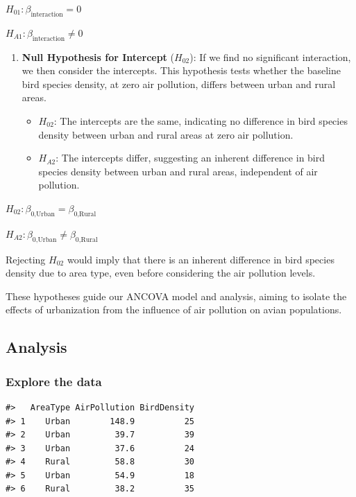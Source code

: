 \documentclass[
  letterpaper,
  DIV=11,
  numbers=noendperiod]{scrreprt}
\begin{document}
\(H_{01}: \beta_{\text{interaction}} = 0\)

\(H_{A1}: \beta_{\text{interaction}} \neq 0\)

\begin{enumerate}
\def\labelenumi{\arabic{enumi}.}
\setcounter{enumi}{2}
\item
  \textbf{Null Hypothesis for Intercept} (\(H_{02}\)): If we find no
  significant interaction, we then consider the intercepts. This
  hypothesis tests whether the baseline bird species density, at zero
  air pollution, differs between urban and rural areas.

  \begin{itemize}
  \item
    \(H_{02}\): The intercepts are the same, indicating no difference in
    bird species density between urban and rural areas at zero air
    pollution.
  \item
    \(H_{A2}\): The intercepts differ, suggesting an inherent difference
    in bird species density between urban and rural areas, independent
    of air pollution.
  \end{itemize}
\end{enumerate}

\(H_{02}: \beta_{0\text{,Urban}} = \beta_{0\text{,Rural}}\)

\(H_{A2}: \beta_{0\text{,Urban}} \neq \beta_{0\text{,Rural}}\)

Rejecting \(H_{02}\) would imply that there is an inherent difference in
bird species density due to area type, even before considering the air
pollution levels.

These hypotheses guide our ANCOVA model and analysis, aiming to isolate
the effects of urbanization from the influence of air pollution on avian
populations.

\subsection{Analysis}\label{analysis}

\subsubsection{Explore the data}\label{explore-the-data}

\begin{verbatim}
#>   AreaType AirPollution BirdDensity
#> 1    Urban        148.9          25
#> 2    Urban         39.7          39
#> 3    Urban         37.6          24
#> 4    Rural         58.8          30
#> 5    Urban         54.9          18
#> 6    Rural         38.2          35
\end{verbatim}
\end{document}
